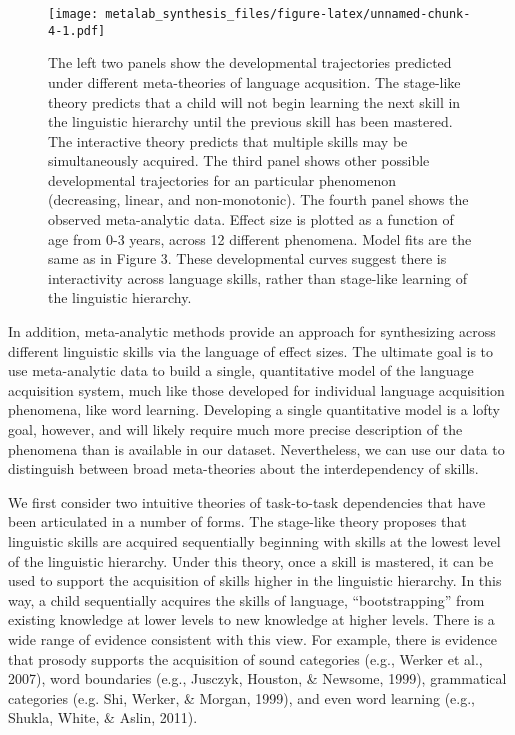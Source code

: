 \documentclass[english,floatsintext,man]{apa6}
\begin{document}
\begin{figure}[htbp]
\centering
\texttt{[image: metalab\_synthesis\_files/figure-latex/unnamed-chunk-4-1.pdf]}
\caption{The left two panels show the developmental trajectories
predicted under different meta-theories of language acqusition. The
stage-like theory predicts that a child will not begin learning the next
skill in the linguistic hierarchy until the previous skill has been
mastered. The interactive theory predicts that multiple skills may be
simultaneously acquired. The third panel shows other possible
developmental trajectories for an particular phenomenon (decreasing,
linear, and non-monotonic). The fourth panel shows the observed
meta-analytic data. Effect size is plotted as a function of age from 0-3
years, across 12 different phenomena. Model fits are the same as in
Figure 3. These developmental curves suggest there is interactivity
across language skills, rather than stage-like learning of the
linguistic hierarchy.}
\end{figure}

In addition, meta-analytic methods provide an approach for synthesizing
across different linguistic skills via the language of effect sizes. The
ultimate goal is to use meta-analytic data to build a single,
quantitative model of the language acquisition system, much like those
developed for individual language acquisition phenomena, like word
learning. Developing a single quantitative model is a lofty goal,
however, and will likely require much more precise description of the
phenomena than is available in our dataset. Nevertheless, we can use our
data to distinguish between broad meta-theories about the
interdependency of skills.

We first consider two intuitive theories of task-to-task dependencies
that have been articulated in a number of forms. The stage-like theory
proposes that linguistic skills are acquired sequentially beginning with
skills at the lowest level of the linguistic hierarchy. Under this
theory, once a skill is mastered, it can be used to support the
acquisition of skills higher in the linguistic hierarchy. In this way, a
child sequentially acquires the skills of language,
\enquote{bootstrapping} from existing knowledge at lower levels to new
knowledge at higher levels. There is a wide range of evidence consistent
with this view. For example, there is evidence that prosody supports the
acquisition of sound categories (e.g., Werker et al., 2007), word
boundaries (e.g., Jusczyk, Houston, \& Newsome, 1999), grammatical
categories (e.g. Shi, Werker, \& Morgan, 1999), and even word learning
(e.g., Shukla, White, \& Aslin, 2011).
\end{document}
